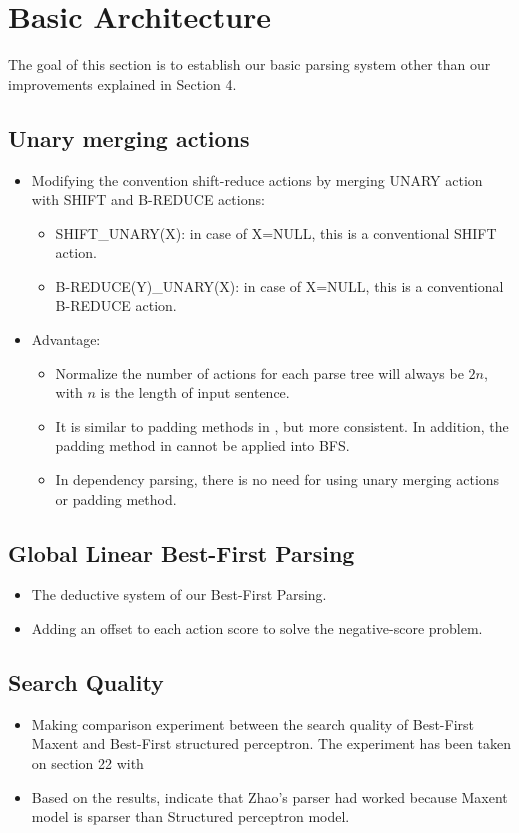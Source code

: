 \section{Basic Architecture}
	The goal of this section is to establish our basic parsing system other than our improvements explained in Section 4.
\subsection{Unary merging actions}
	\begin{itemize}
		\item Modifying the convention shift-reduce actions by merging UNARY action with SHIFT and B-REDUCE actions:
			\begin{itemize}
				\item SHIFT\_UNARY(X): in case of X=NULL, this is a conventional SHIFT action.
				\item B-REDUCE(Y)\_UNARY(X): in case of X=NULL, this is a conventional B-REDUCE action.
			\end{itemize}
		\item Advantage: 
			\begin{itemize}
				\item Normalize the number of actions for each parse tree will always be $2n$, with $n$ is the length of input sentence.
				\item It is similar to padding methods in \cite{2012Zhu}, but more consistent. In addition, the padding method in \cite{2012Zhu} cannot be applied into BFS.
				\item In dependency parsing, there is no need for using unary merging actions or padding method.
			\end{itemize}
	\end{itemize}
\subsection{Global Linear Best-First Parsing}
	\begin{itemize}
		\item The deductive system of our Best-First Parsing.
		\item Adding an offset to each action score to solve the negative-score problem.
	\end{itemize}
\subsection{Search Quality}
	\begin{itemize}
		\item Making comparison experiment between the search quality of Best-First Maxent and Best-First structured perceptron. The experiment has been taken on section 22 with 
		\item Based on the results, indicate that Zhao's parser had worked because Maxent model is sparser than Structured perceptron model.
	\end{itemize}